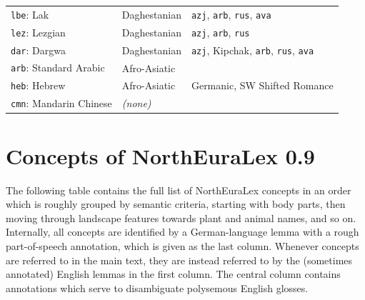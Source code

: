 \begin{center}
\begin{longtable}{lll}
\texttt{lbe}: Lak & Daghestanian & \texttt{azj}, \texttt{arb}, \texttt{rus}, \texttt{ava}\\
\texttt{lez}: Lezgian & Daghestanian & \texttt{azj}, \texttt{arb}, \texttt{rus}\\
\texttt{dar}: Dargwa & Daghestanian & \texttt{azj}, Kipchak, \texttt{arb}, \texttt{rus}, \texttt{ava}\\
\hline
\texttt{arb}: Standard Arabic & Afro-Asiatic & \\
\texttt{heb}: Hebrew & Afro-Asiatic & Germanic, SW Shifted Romance\\
\hline
\texttt{cmn}: Mandarin Chinese & \textit{(none)} & \\
\end{longtable}
 \addtocounter{table}{-1}
\end{center}

\section{Concepts of NorthEuraLex 0.9}
The following table contains the full list of NorthEuraLex concepts in an order which is roughly grouped by semantic criteria, starting with body parts, then moving through landscape features towards plant and animal names, and so on. Internally, all concepts are identified by a German-language lemma with a rough part-of-speech annotation, which is given as the last column. Whenever concepts are referred to in the main text, they are instead referred to by the (sometimes annotated) English lemmas in the first column. The central column contains annotations which serve to disambiguate polysemous English glosses.

